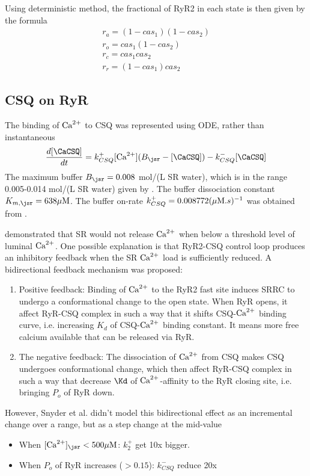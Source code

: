 Using deterministic method, the fractional of RyR2 in each state is then given
by the formula
\begin{equation}
\begin{split}
r_a = (1-cas_1)(1-cas_2) \\
r_o = cas_1 (1-cas_2) \\
r_c = cas_1 cas_2 \\
r_r = (1-cas_1) cas_2
\end{split}
\end{equation}


\subsection{CSQ on RyR}

The binding of ${\text{Ca}^{2+}}$ to CSQ was represented using ODE, rather than instantaneous
\begin{equation}
\frac{d[\CaCSQ]}{dt} = k^+_{CSQ} [\Ca] (B_\jsr - [\CaCSQ]) - k^-_{CSQ} [\CaCSQ]
\end{equation}
The maximum buffer $B_\jsr = 0.008$ mol/(L SR water), which is in the range
0.005-0.014 mol/(L SR water) given by \citep{bers1993rrd, shannon1997}. The
buffer dissociation constant $K_{m,\jsr}=638\muM$. The buffer on-rate
$k^+_{CSQ} = 0.008772 ({\mu\text{M}}.s)^{-1}$ was obtained from \citep{Donoso1995}.

\citep{gilchrist1992icd} demonstrated that SR would not release ${\text{Ca}^{2+}}$ when below
a threshold level of luminal ${\text{Ca}^{2+}}$. One possible explanation is that RyR2-CSQ
control loop produces an inhibitory feedback when the SR ${\text{Ca}^{2+}}$ load is
sufficiently reduced. A bidirectional feedback mechanism was proposed:
\begin{enumerate}
  \item Positive feedback: Binding of ${\text{Ca}^{2+}}$ to the RyR2 fast site induces SRRC
  to undergo a conformational change to the open state. When RyR opens, it affect RyR-CSQ
  complex in such a way that it shifts CSQ-${\text{Ca}^{2+}}$ binding curve, i.e. increasing
  $K_d$ of CSQ-${\text{Ca}^{2+}}$ binding constant. It means more free calcium available that
  can be released via RyR.

  \item The negative feedback: The dissociation of ${\text{Ca}^{2+}}$ from CSQ makes CSQ
  undergoes conformational change, which then affect RyR-CSQ complex in such a
  way that decrease $\Kd$ of ${\text{Ca}^{2+}}$-affinity to the RyR closing site, i.e.
  bringing $P_o$ of RyR down.
\end{enumerate}

However, Snyder et al. didn't model this bidirectional effect as an incremental
change over a range, but as a step change at the mid-value
\begin{itemize}
  \item When $[\Ca]_\jsr < 500\muM$: $k^+_2$ get 10x bigger.
  \item When $P_o$ of RyR increases ($>0.15$): $k^-_{CSQ}$ reduce 20x
\end{itemize}

